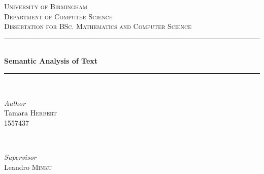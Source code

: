 \documentclass{article}
\begin{document}

\begin{titlepage} %
	\newcommand{\HRule}{\rule{\linewidth}{0.5mm}} %
	
	\center %
	
	
	\textsc{\LARGE University of Birmingham}\\[1.5cm] %
	
	\textsc{\Large Department of Computer Science}\\[0.5cm] %
	
	\textsc{\large Dissertation for BSc. Mathematics and Computer Science}\\[0.5cm] %
	
	
	\HRule\\[0.4cm]
	
	{\huge\bfseries Semantic Analysis of Text}\\[0.4cm] %
	
	\HRule\\[1.5cm]
	
	
	\begin{minipage}{0.4\textwidth}
		\begin{flushleft}
			\large
			\textit{Author}\\
			Tamara \textsc{Herbert} \\
			1557437%
		\end{flushleft}
	\end{minipage}
	~
	\begin{minipage}{0.4\textwidth}
		\begin{flushright}
			\large
			\textit{Supervisor}\\
			Leandro \textsc{Minku} %
		\end{flushright}
	\end{minipage}
	

\end{titlepage}
\end{document}
